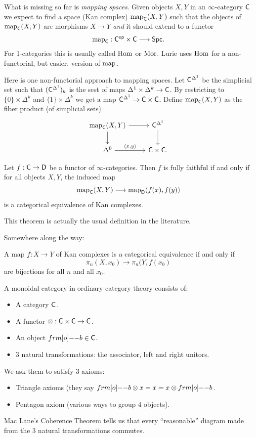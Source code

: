 What is missing so far is \emph{mapping spaces}. Given objects $X,Y$ in an
$\infty$-category $\mathsf{C}$ we expect to find a space (Kan complex) $\operatorname{map}_\mathsf{C}(X,Y)$ such that
the objects of $\operatorname{map}_\mathsf{C}(X,Y)$ are morphisms $X\to Y$ \emph{and} it should extend to a functor
\[
\map_\C : \C\op\times \C\to \cat{Spc}.
\]
For 1-categories this is usually called $\operatorname{Hom}$ or $\operatorname{Mor}$. Lurie uses $\operatorname{Hom}$ for a
non-functorial, but easier, version of $\operatorname{map}$.

Here is one non-functorial approach to mapping spaces. Let $\mathsf{C}^{\Delta^{1}}$ be the
simplicial set such that $(\mathsf{C}^{\Delta^{1}})_k$ is the sest of maps $\Delta^{1}\times
\Delta^{k}\to \C$. By restricting to $\{0\} \times \Delta^{k}$ and $\{1\} \times
\Delta^{k}$ we get a map $\C^{\Delta^{1}}\to \C\times \C$. Define $\operatorname{map}_\mathsf{C}(X,Y)$ as the
fiber product (of simplicial sets)
\[
\begin{tikzcd}
	\map_\C(X,Y) \ar[r] \ar[d] & \C^{\Delta^{1}} \ar[d] \\
	\Delta^{0} \ar[r,"{(x,y)}"] & \C\times \C.
\end{tikzcd}
\]
\begin{theorem}
Let $f:\C\to \cat{D}$ be a functor of $\infty$-categories. Then $f$ is fully faithful if
and only if for all objects $X,Y$, the induced map
\[
	\map_\C(X,Y)\to \map_{\cat{D}}(f(x),f(y))
\]
is a categorical equivalence of Kan complexes.
\end{theorem}
This theorem is actually the usual definition in the literature.

Somewhere along the way:
\begin{theorem}
A map $f:X\to Y$ of Kan complexes is a categorical equivalence if and only if
\[
	\pi_n(X,x_0) \to  \pi_n(Y,f(x_0)
	\]
	are bijections for all $n$ and all $x_0$.
\end{theorem}
A monoidal category in ordinary category theory consists of:
\begin{itemize}
	\item A category $\mathsf{C}$.
	\item A functor $\otimes:\C\times \C\to \C$.
	\item An object $\1b\in \C$.
	\item 3 natural transformations: the associator, left and right unitors.
\end{itemize}
We ask them to satisfy 3 axioms:
\begin{itemize}
	\item Triangle axioms (they say $\1b\otimes x = x = x\otimes\1b$.
		\item Pentagon axiom (various ways to group 4 objects).
	\end{itemize}
	Mac Lane's Coherence Theorem tells us that every ``reasonable'' diagram made from the 3
	natural transformations commutes.

